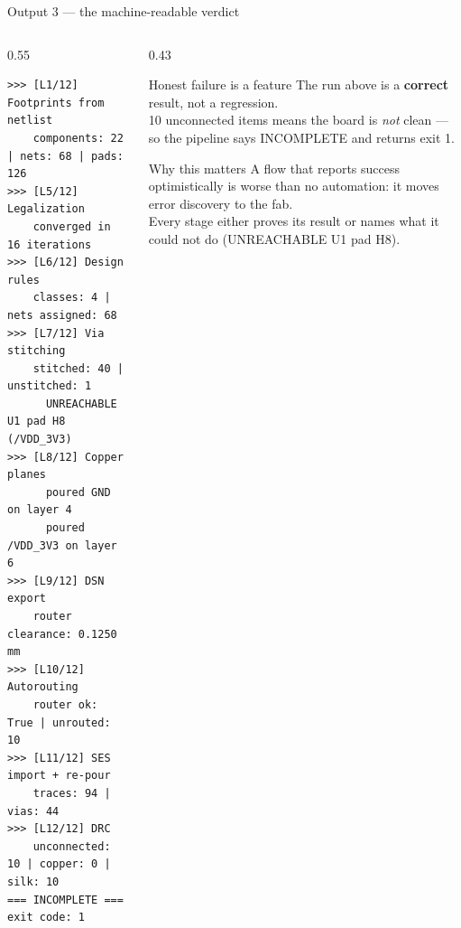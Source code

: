 \documentclass[aspectratio=169,10pt]{beamer}
\newcommand{\code}[1]{{\ttfamily\small #1}}
\begin{document}
\begin{frame}[fragile]{Output 3 --- the machine-readable verdict}
\vspace{1mm}
\begin{columns}[T]
\begin{column}{0.55\textwidth}
\begin{lstlisting}
>>> [L1/12] Footprints from netlist
    components: 22 | nets: 68 | pads: 126
>>> [L5/12] Legalization
    converged in 16 iterations
>>> [L6/12] Design rules
    classes: 4 | nets assigned: 68
>>> [L7/12] Via stitching
    stitched: 40 | unstitched: 1
      UNREACHABLE U1 pad H8 (/VDD_3V3)
>>> [L8/12] Copper planes
      poured GND on layer 4
      poured /VDD_3V3 on layer 6
>>> [L9/12] DSN export
    router clearance: 0.1250 mm
>>> [L10/12] Autorouting
    router ok: True | unrouted: 10
>>> [L11/12] SES import + re-pour
    traces: 94 | vias: 44
>>> [L12/12] DRC
    unconnected: 10 | copper: 0 | silk: 10
=== INCOMPLETE ===   exit code: 1
\end{lstlisting}
\end{column}
\begin{column}{0.43\textwidth}
\begin{block}{Honest failure is a feature}
\small
The run above is a \textbf{correct} result, not a regression.\\[4pt]
10 unconnected items means the board is \emph{not} clean --- so the pipeline says \code{INCOMPLETE} and returns \code{exit 1}.
\end{block}
\vspace{2mm}
\begin{block}{Why this matters}
\small
A flow that reports success optimistically is worse than no automation: it moves error discovery to the fab.\\[4pt]
Every stage either proves its result or names what it could not do (\code{UNREACHABLE U1 pad H8}).
\end{block}
\end{column}
\end{columns}
\end{frame}
\end{document}
